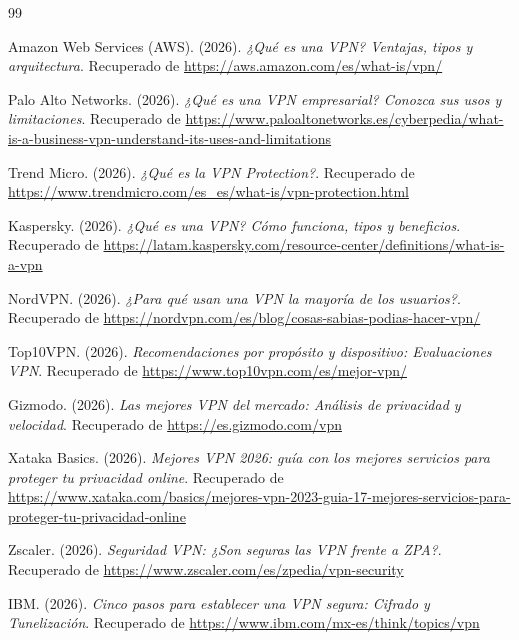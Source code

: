 \documentclass[a4paper,12pt]{article}
\begin{document}
\newpage
\begin{thebibliography}{99}
    
    Amazon Web Services (AWS). (2026). \textit{¿Qué es una VPN? Ventajas, tipos y arquitectura}. Recuperado de \url{https://aws.amazon.com/es/what-is/vpn/}

    Palo Alto Networks. (2026). \textit{¿Qué es una VPN empresarial? Conozca sus usos y limitaciones}. Recuperado de \url{https://www.paloaltonetworks.es/cyberpedia/what-is-a-business-vpn-understand-its-uses-and-limitations}

    Trend Micro. (2026). \textit{¿Qué es la VPN Protection?}. Recuperado de \url{https://www.trendmicro.com/es_es/what-is/vpn-protection.html}
    
    Kaspersky. (2026). \textit{¿Qué es una VPN? Cómo funciona, tipos y beneficios}. Recuperado de \url{https://latam.kaspersky.com/resource-center/definitions/what-is-a-vpn}

    NordVPN. (2026). \textit{¿Para qué usan una VPN la mayoría de los usuarios?}. Recuperado de \url{https://nordvpn.com/es/blog/cosas-sabias-podias-hacer-vpn/}

    Top10VPN. (2026). \textit{Recomendaciones por propósito y dispositivo: Evaluaciones VPN}. Recuperado de \url{https://www.top10vpn.com/es/mejor-vpn/}

    Gizmodo. (2026). \textit{Las mejores VPN del mercado: Análisis de privacidad y velocidad}. Recuperado de \url{https://es.gizmodo.com/vpn}

    Xataka Basics. (2026). \textit{Mejores VPN 2026: guía con los mejores servicios para proteger tu privacidad online}. Recuperado de \url{https://www.xataka.com/basics/mejores-vpn-2023-guia-17-mejores-servicios-para-proteger-tu-privacidad-online}

    Zscaler. (2026). \textit{Seguridad VPN: ¿Son seguras las VPN frente a ZPA?}. Recuperado de \url{https://www.zscaler.com/es/zpedia/vpn-security}

    IBM. (2026). \textit{Cinco pasos para establecer una VPN segura: Cifrado y Tunelización}. Recuperado de \url{https://www.ibm.com/mx-es/think/topics/vpn}


\end{thebibliography}
\end{document}
